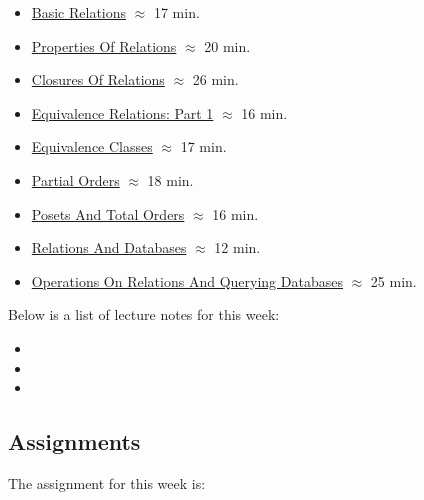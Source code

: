 \begin{itemize}
    \item \href{https://applied.cs.colorado.edu/mod/hvp/view.php?id=51853}{Basic Relations} $\approx$ 17 min.
    \item \href{https://applied.cs.colorado.edu/mod/hvp/view.php?id=51854}{Properties Of Relations} $\approx$ 20 min.
    \item \href{https://applied.cs.colorado.edu/mod/hvp/view.php?id=51855}{Closures Of Relations} $\approx$ 26 min.
    \item \href{https://applied.cs.colorado.edu/mod/hvp/view.php?id=51856}{Equivalence Relations: Part 1} $\approx$ 16 min.
    \item \href{https://applied.cs.colorado.edu/mod/hvp/view.php?id=51857}{Equivalence Classes} $\approx$ 17 min.
    \item \href{https://applied.cs.colorado.edu/mod/hvp/view.php?id=51858}{Partial Orders} $\approx$ 18 min.
    \item \href{https://applied.cs.colorado.edu/mod/hvp/view.php?id=51859}{Posets And Total Orders} $\approx$ 16 min.
    \item \href{https://applied.cs.colorado.edu/mod/hvp/view.php?id=51860}{Relations And Databases} $\approx$ 12 min.
    \item \href{https://applied.cs.colorado.edu/mod/hvp/view.php?id=51861}{Operations On Relations And Querying Databases} $\approx$ 25 min.
\end{itemize}

\noindent Below is a list of lecture notes for this week:

\begin{itemize}
    \item {}
    \item {}
    \item {}
\end{itemize}

\subsection{Assignments}

The assignment for this week is:

